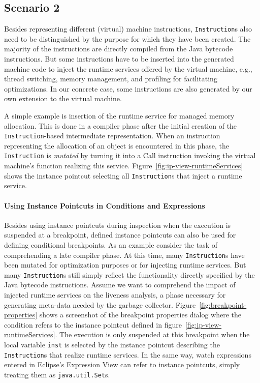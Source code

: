 \documentclass{sig-alternate}
\begin{document}
\subsection{Scenario 2}

Besides representing different (virtual) machine instructions, \lstinline!Instruction!s also need to be distinguished by the purpose for which they have been created.
The majority of the instructions are directly compiled from the Java bytecode instructions.
But some instructions have to be inserted into the generated machine code to inject the runtime services offered by the virtual machine, e.g., thread switching, memory management, and profiling for facilitating optimizations.
In our concrete case, some instructions are also generated by our own extension to the virtual machine.

A simple example is insertion of the runtime service for managed memory allocation.
This is done in a compiler phase after the initial creation of the \lstinline!Instruction!-based intermediate representation.
When an instruction representing the allocation of an object is encountered in this phase, the \lstinline!Instruction! is \emph{mutated} by turning it into a Call instruction invoking the virtual machine's function realizing this service.
Figure~\ref{fig:ip-view-runtimeServices} shows the instance pointcut selecting all \lstinline!Instruction!s that inject a runtime service.


\paragraph{Using Instance Pointcuts in Conditions and Expressions}

Besides using instance pointcuts during inspection when the execution is suspended at a breakpoint, defined instance pointcuts can also be used for defining conditional breakpoints.
As an example consider the task of comprehending a late compiler phase.
At this time, many \lstinline!Instruction!s have been mutated for optimization purposes or for injecting runtime services.
But many \lstinline!Instruction!s still simply reflect the functionality directly specified by the Java bytecode instructions.
Assume we want to comprehend the impact of injected runtime services on the liveness analysis, a phase necessary for generating meta-data needed by the garbage collector.
Figure~\ref{fig:breakpoint-properties} shows a screenshot of the breakpoint properties dialog where the condition refers to the instance pointcut defined in figure~\ref{fig:ip-view-runtimeServices}.
The execution is only suspended at this breakpoint when the local variable \lstinline!inst! is selected by the instance pointcut describing the \lstinline!Instruction!s that realize runtime services.
In the same way, watch expressions entered in Eclipse's Expression View can refer to instance pointcuts, simply treating them as \lstinline!java.util.Set!s.
\end{document}
